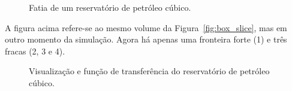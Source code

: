 \begin{figure}[h]
	\centering
	\caption{Fatia de um reservatório de petróleo cúbico.}
	\label{fig:r_vrep_2_slice}
\end{figure}

	A figura acima refere-se ao mesmo volume da Figura~\ref{fig:box_slice}, mas em outro momento da simulação. Agora há apenas uma fronteira forte (1) e três fracas (2, 3 e 4).

\begin{figure}[h]
	\centering
	\caption{Visualização e função de transferência do reservatório de petróleo cúbico.}
	\label{fig:r_vrep_2}
\end{figure}

